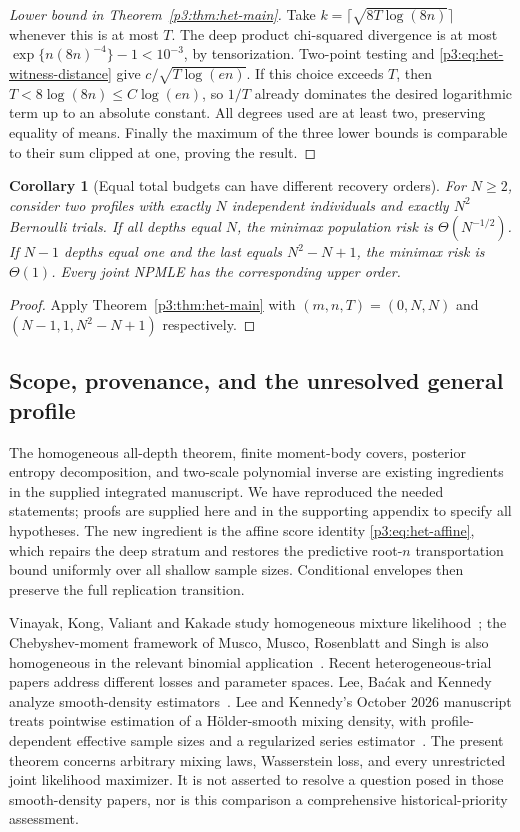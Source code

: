 \documentclass[11pt,a4paper]{article}
\newtheorem{corollary}[theorem]{Corollary}
\theoremstyle{definition}
\theoremstyle{remark}
\numberwithin{equation}{section}
\begin{document}
\begin{proof}[Lower bound in Theorem~\ref{p3:thm:het-main}]
Take $k=\lceil\sqrt{8T\log(8n)}\rceil$ whenever this is at most $T$.
The deep product chi-squared divergence is at most
$\exp\{n(8n)^{-4}\}-1<10^{-3}$, by tensorization.  Two-point testing
and \eqref{p3:eq:het-witness-distance} give
$c/\sqrt{T\log(en)}$.  If this choice exceeds $T$, then
$T<8\log(8n)\le C\log(en)$, so $1/T$ already dominates the desired
logarithmic term up to an absolute constant.  All degrees used are at
least two, preserving equality of means.  Finally the maximum of the
three lower bounds is comparable to their sum clipped at one, proving
the result.
\end{proof}

\begin{corollary}[Equal total budgets can have different recovery orders]
\label{p3:cor:het-profile}
For $N\ge2$, consider two profiles with exactly $N$ independent
individuals and exactly $N^2$ Bernoulli trials.  If all depths equal $N$,
the minimax population risk is $\Theta(N^{-1/2})$.  If $N-1$ depths equal
one and the last equals $N^2-N+1$, the minimax risk is $\Theta(1)$.
Every joint NPMLE has the corresponding upper order.
\end{corollary}
\begin{proof}
Apply Theorem~\ref{p3:thm:het-main} with $(m,n,T)=(0,N,N)$ and
$(N-1,1,N^2-N+1)$ respectively.
\end{proof}

\subsection{Scope, provenance, and the unresolved general profile}

The homogeneous all-depth theorem, finite moment-body covers, posterior
entropy decomposition, and two-scale polynomial inverse are existing
ingredients in the supplied integrated manuscript.  We have reproduced the
needed statements; proofs are supplied here and in the supporting appendix
to specify all hypotheses.
The new ingredient is the affine score identity
\eqref{p3:eq:het-affine}, which repairs the deep stratum and restores the
predictive root-$n$ transportation bound uniformly over all shallow sample
sizes.  Conditional envelopes then preserve the full replication transition.

Vinayak, Kong, Valiant and Kakade study homogeneous mixture
likelihood~\cite{p8:BT_VKVK2019}; the Chebyshev-moment framework of Musco,
Musco, Rosenblatt and Singh is also homogeneous in the relevant binomial
application~\cite{p3:RT_MMRS2025}.  Recent heterogeneous-trial papers address
different losses and parameter spaces.  Lee, Ba\'cak and Kennedy analyze
smooth-density estimators~\cite{p3:LeeBacakKennedy2025}.  Lee and Kennedy's
October 2026 manuscript treats pointwise estimation of a H\"older-smooth
mixing density, with profile-dependent effective sample sizes and a
regularized series estimator~\cite{p3:LeeKennedy2026}.  The present theorem
concerns arbitrary mixing laws, Wasserstein loss, and every unrestricted
joint likelihood maximizer.  It is not asserted to resolve a question posed
in those smooth-density papers, nor is this comparison a comprehensive
historical-priority assessment.
\end{document}
